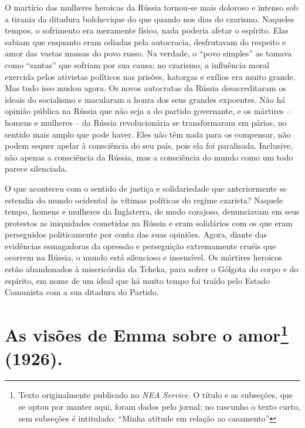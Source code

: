 O martírio das mulheres heroicas da Rússia tornou-se mais doloroso e
intenso sob a tirania da ditadura bolchevique do que quando nos dias do
czarismo. Naqueles tempos, o sofrimento era meramente físico, nada
poderia afetar o espírito. Elas sabiam que enquanto eram odiadas pela
autocracia, desfrutavam do respeito e amor das vastas massas do povo
russo. Na verdade, o ``povo simples'' as tomava como ``santas'' que
sofriam por sua causa; no czarismo, a influência moral exercida pelos
ativistas políticos nas prisões, katorgas e exílios era muito grande.
Mas tudo isso mudou agora. Os novos autocratas da Rússia desacreditaram
os ideais do socialismo e macularam a honra dos seus grandes expoentes.
Não há opinião pública na Rússia que não seja a do partido governante, e
os mártires -- homens e mulheres -- da Rússia revolucionária se
transformaram em párias, no sentido mais amplo que pode haver. Eles não
têm nada para os compensar, não podem sequer apelar à consciência do seu
país, pois ela foi paralisada. Inclusive, não apenas a consciência da
Rússia, mas a consciência do mundo como um todo parece silenciada.

O que aconteceu com o sentido de justiça e solidariedade que
anteriormente se estendia do mundo ocidental às vítimas políticas do
regime czarista? Naquele tempo, homens e mulheres da Inglaterra, de modo
corajoso, denunciavam em seus protestos as iniquidades cometidas na
Rússia e eram solidários com os que eram perseguidos politicamente por
conta das suas opiniões. Agora, diante das evidências esmagadoras da
opressão e perseguição extremamente cruéis que ocorrem na Rússia, o
mundo está silencioso e insensível. Os mártires heroicos estão
abandonados à misericórdia da Tcheka, para sofrer o Gólgota do corpo e
do espírito, em nome de um ideal que há muito tempo foi traído pelo
Estado Comunista com a sua ditadura do Partido.

\chapter[As visões de Emma sobre o amor (1926)]{As visões de Emma sobre o amor\footnote[*]{Texto originalmente publicado no
  \emph{NEA Service}. O título e as subseções, que se optou por manter
  aqui, foram dados pelo jornal; no rascunho o texto curto, sem
  subseções é intitulado: ``Minha atitude em relação ao casamento''} (1926).}

